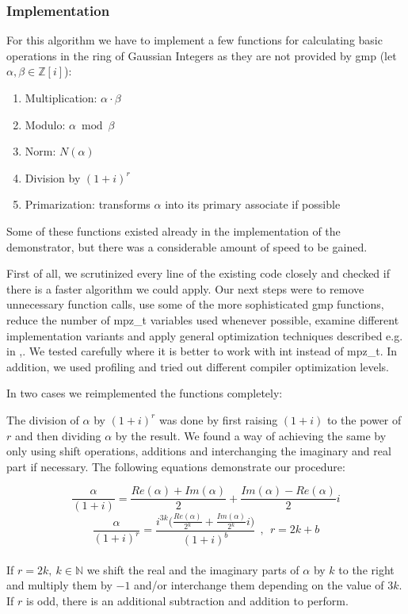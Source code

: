\documentclass[a4paper, 11pt]{article}
\begin{document}
 \subsubsection{Implementation} 
 For this algorithm we have to implement a few functions for calculating basic operations in the ring of Gaussian Integers as they are not provided by gmp (let $\alpha, \beta \in \mathbb{Z}[{i}]$): 
 
 \begin{enumerate} 
 \item Multiplication: $\alpha \cdot \beta$ 
 \item Modulo: $\alpha \bmod \beta$ 
 \item Norm: $N(\alpha)$ 
 \item Division by $(1+i)^r$ 
 \item Primarization: transforms $\alpha$ into its primary associate if possible 
 \end{enumerate} 
 Some of these functions existed already in the implementation of the demonstrator, but there was a considerable amount of speed to be gained. 
 
 First of all, we scrutinized every line of the existing code closely and checked if there is a faster algorithm we could apply. Our next steps were to remove unnecessary function calls, use some of the more sophisticated gmp functions, reduce the number of \ttfamily mpz\_t \normalfont variables used whenever possible, examine different implementation variants and apply general optimization techniques described e.g. in \cite{opt1},\cite{opt2}. We tested carefully where it is better to work with \ttfamily int \normalfont instead of \ttfamily mpz\_t\normalfont. In addition, we used profiling and tried out different compiler optimization levels. 
 
 In two cases we reimplemented the functions completely: 
 
 The division of $\alpha$ by $(1+i)^r$  was done by first raising $(1+i)$ to the power of $r$ and then dividing $\alpha$ by the result. We found a way of achieving the same by only using shift operations, additions and interchanging the imaginary and real part if necessary. The following equations demonstrate our procedure: 

 \[\frac{\alpha }{(1+i)} = \frac{Re(\alpha)+Im(\alpha)}{2} + \frac{Im(\alpha)- Re(\alpha)}{2} i\] 
 \[ \frac{\alpha}{(1+i)^r} = \frac{i^{3k}\Big(\frac{Re(\alpha)}{2{^k}} + \frac{Im(\alpha)}{2{^k}}i\Big) }{(1+i)^b}~~,~~r = 2k + b\] \\  
 If $r=2k,~k \in \mathbb{N}$ we shift the real and the imaginary parts of $\alpha$ by $k$ to the right and multiply them by $-1$ and/or interchange them  depending on the value of $3k$. If $r$ is odd, there is an additional subtraction and addition to perform. 
 
\end{document}
